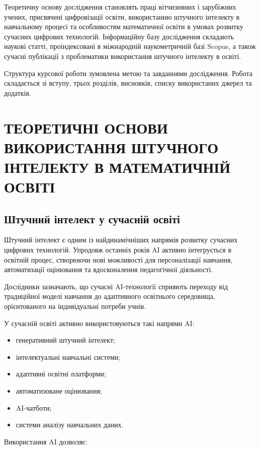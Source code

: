 Теоретичну основу дослідження становлять праці вітчизняних і зарубіжних учених, присвячені цифровізації освіти, використанню штучного інтелекту в навчальному процесі та особливостям математичної освіти в умовах розвитку сучасних цифрових технологій. Інформаційну базу дослідження складають наукові статті, проіндексовані в міжнародній наукометричній базі Scopus, а також сучасні публікації з проблематики використання штучного інтелекту в освіті.

Структура курсової роботи зумовлена метою та завданнями дослідження. Робота складається зі вступу, трьох розділів, висновків, списку використаних джерел та додатків.


\section{ТЕОРЕТИЧНІ ОСНОВИ ВИКОРИСТАННЯ ШТУЧНОГО ІНТЕЛЕКТУ В МАТЕМАТИЧНІЙ ОСВІТІ}

\subsection{Штучний інтелект у сучасній освіті}

Штучний інтелект є одним із найдинамічніших напрямів розвитку сучасних цифрових технологій. Упродовж останніх років AI активно інтегрується в освітній процес, створюючи нові можливості для персоналізації навчання, автоматизації оцінювання та вдосконалення педагогічної діяльності.

Дослідники зазначають, що сучасні AI-технології сприяють переходу від традиційної моделі навчання до адаптивного освітнього середовища, орієнтованого на індивідуальні потреби учнів.

У сучасній освіті активно використовуються такі напрями AI:

\begin{itemize}
\item генеративний штучний інтелект;
\item інтелектуальні навчальні системи;
\item адаптивні освітні платформи;
\item автоматизоване оцінювання;
\item AI-чатботи;
\item системи аналізу навчальних даних.
\end{itemize}

Використання AI дозволяє:

